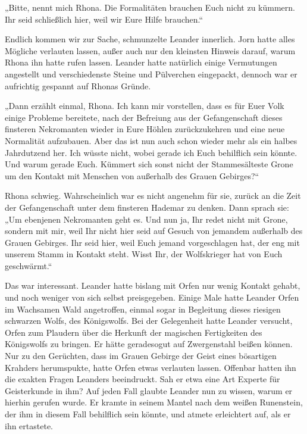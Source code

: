 „Bitte, nennt mich Rhona. Die Formalitäten brauchen Euch nicht zu kümmern. Ihr seid schließlich hier, weil wir Eure Hilfe brauchen.“

Endlich kommen wir zur Sache, schmunzelte Leander innerlich. Jorn hatte alles Mögliche verlauten lassen, außer auch nur den kleinsten Hinweis darauf, warum Rhona ihn hatte rufen lassen. Leander hatte natürlich einige Vermutungen angestellt und verschiedenste Steine und Pülverchen eingepackt, dennoch war er aufrichtig gespannt auf Rhonas Gründe.

„Dann erzählt einmal, Rhona. Ich kann mir vorstellen, dass es für Euer Volk einige Probleme bereitete, nach der Befreiung aus der Gefangenschaft dieses finsteren Nekromanten wieder in Eure Höhlen zurückzukehren und eine neue Normalität aufzubauen. Aber das ist nun auch schon wieder mehr als ein halbes Jahrdutzend her. Ich wüsste nicht, wobei gerade ich Euch behilflich sein könnte. Und warum gerade Euch. Kümmert sich sonst nicht der Stammesälteste Grone um den Kontakt mit Menschen von außerhalb des Grauen Gebirges?“

Rhona schwieg. Wahrscheinlich war es nicht angenehm für sie, zurück an die Zeit der Gefangenschaft unter dem finsteren Hademar zu denken. Dann sprach sie: „Um ebenjenen Nekromanten geht es. Und nun ja, Ihr redet nicht mit Grone, sondern mit mir, weil Ihr nicht hier seid auf Gesuch von jemandem außerhalb des Grauen Gebirges. Ihr seid hier, weil Euch jemand vorgeschlagen hat, der eng mit unserem Stamm in Kontakt steht. Wisst Ihr, der Wolfskrieger hat von Euch geschwärmt.“

Das war interessant. Leander hatte bislang mit Orfen nur wenig Kontakt gehabt, und noch weniger von sich selbst preisgegeben. Einige Male hatte Leander Orfen im Wachsamen Wald angetroffen, einmal sogar in Begleitung dieses riesigen schwarzen Wolfs, des Königswolfs. Bei der Gelegenheit hatte Leander versucht, Orfen zum Plaudern über die Herkunft der magischen Fertigkeiten des Königswolfs zu bringen. Er hätte geradesogut auf Zwergenstahl beißen können. Nur zu den Gerüchten, dass im Grauen Gebirge der Geist eines bösartigen Krahders herumspukte, hatte Orfen etwas verlauten lassen. Offenbar hatten ihn die exakten Fragen Leanders beeindruckt. Sah er etwa eine Art Experte für Geisterkunde in ihm? Auf jeden Fall glaubte Leander nun zu wissen, warum er hierhin gerufen wurde. Er kramte in seinem Mantel nach dem weißen Runenstein, der ihm in diesem Fall behilflich sein könnte, und atmete erleichtert auf, als er ihn ertastete.

